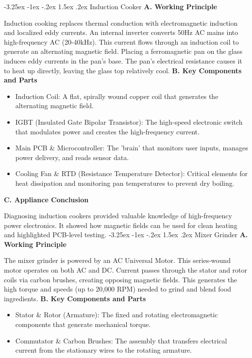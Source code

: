 \documentclass[11pt,a4paper]{report}
\makeatletter
\renewcommand{\section}{\@startsection{section}{1}{\z@}%
  {-3.25ex \@plus -1ex \@minus -.2ex}%
  {1.5ex \@plus.2ex}%
  {\normalfont\Large\bfseries\color{primaryColor}}}
\makeatother
\begin{document}
\section{Induction Cooker}
\noindent\textbf{A. Working Principle}\par\medskip
Induction cooking replaces thermal conduction with electromagnetic induction and localized eddy currents. An internal inverter converts 50Hz AC mains into high-frequency AC (20-40kHz). This current flows through an induction coil to generate an alternating magnetic field. Placing a ferromagnetic pan on the glass induces eddy currents in the pan's base. The pan's electrical resistance causes it to heat up directly, leaving the glass top relatively cool.
\noindent\textbf{B. Key Components and Parts}\par\medskip
\begin{itemize}
  \item Induction Coil: A flat, spirally wound copper coil that generates the alternating magnetic field.
  \item IGBT (Insulated Gate Bipolar Transistor): The high-speed electronic switch that modulates power and creates the high-frequency current.
  \item Main PCB \& Microcontroller: The 'brain' that monitors user inputs, manages power delivery, and reads sensor data.
  \item Cooling Fan \& RTD (Resistance Temperature Detector): Critical elements for heat dissipation and monitoring pan temperatures to prevent dry boiling.
\end{itemize}
\noindent\textbf{C. Appliance Conclusion}\par\medskip
Diagnosing induction cookers provided valuable knowledge of high-frequency power electronics. It showed how magnetic fields can be used for clean heating and highlighted PCB-level testing.
\section{Mixer Grinder}
\noindent\textbf{A. Working Principle}\par\medskip
The mixer grinder is powered by an AC Universal Motor. This series-wound motor operates on both AC and DC. Current passes through the stator and rotor coils via carbon brushes, creating opposing magnetic fields. This generates the high torque and speeds (up to 20,000 RPM) needed to grind and blend food ingredients.
\noindent\textbf{B. Key Components and Parts}\par\medskip
\begin{itemize}
  \item Stator \& Rotor (Armature): The fixed and rotating electromagnetic components that generate mechanical torque.
  \item Commutator \& Carbon Brushes: The assembly that transfers electrical current from the stationary wires to the rotating armature.
\end{itemize}
\end{document}
